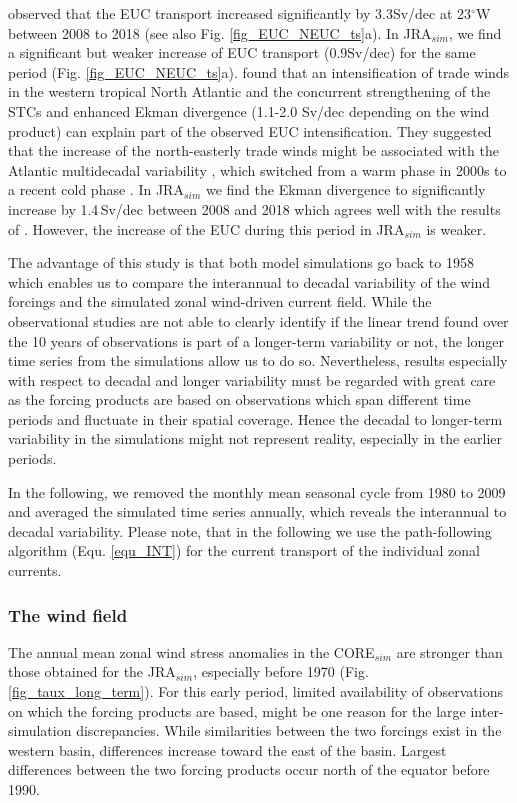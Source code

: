 \documentclass[os, manuscript]{copernicus}
\begin{document}
	\cite{Brandt2021a} observed that the EUC transport increased significantly by 3.3Sv/dec at 23$^{\circ}$W between 2008 to 2018 (see also Fig. \ref{fig_EUC_NEUC_ts}a). In JRA$_{sim}$, we find a significant but weaker increase of EUC transport (0.9Sv/dec) for the same period (Fig. \ref{fig_EUC_NEUC_ts}a). \cite{Brandt2021a} found that an intensification of trade winds in the western tropical North Atlantic and the concurrent strengthening of the STCs and enhanced Ekman divergence (1.1-2.0 Sv/dec depending on the wind product) can explain part of the observed EUC intensification. They suggested that the increase of the north-easterly trade winds might be associated with the Atlantic multidecadal variability \citep[AMV,][]{Delworth2000}, which switched from a warm phase in 2000s to a recent cold phase \citep{Frajka-Williams2017}. In JRA$_{sim}$ we find the Ekman divergence to significantly increase by 1.4$\,$Sv/dec between 2008 and 2018 which agrees well with the results of \cite{Brandt2021a}. However, the increase of the EUC during this period in JRA$_{sim}$ is weaker.
	
	The advantage of this study is that both model simulations go back to 1958 which enables us to compare the interannual to decadal variability of the wind forcings and the simulated zonal wind-driven current field. While the observational studies are not able to clearly identify if the linear trend found over the 10 years of observations is part of a longer-term variability or not, the longer time series from the simulations allow us to do so. Nevertheless, results especially with respect to decadal and longer variability must be regarded with great care as the forcing products are based on observations which span different time periods and fluctuate in their spatial coverage. Hence the decadal to longer-term variability in the simulations might not represent reality, especially in the earlier periods. 
	
	In the following, we removed the monthly mean seasonal cycle from 1980 to 2009 and averaged the simulated time series annually, which reveals the interannual to decadal variability. Please note, that in the following we use the path-following algorithm (Equ. \ref{equ_INT}) for the current transport of the individual zonal currents.
	
	
	\subsubsection{The wind field}
	The annual mean zonal wind stress anomalies in the CORE$_{sim}$ are stronger than those obtained for the JRA$_{sim}$, especially before 1970 (Fig. \ref{fig_taux_long_term}). For this early period, limited availability of observations on which the forcing products are based, might be one reason for the large inter-simulation discrepancies. While similarities between the two forcings exist in the western basin, differences increase toward the east of the basin. Largest differences between the two forcing products occur north of the equator before 1990.
	
\end{document}
